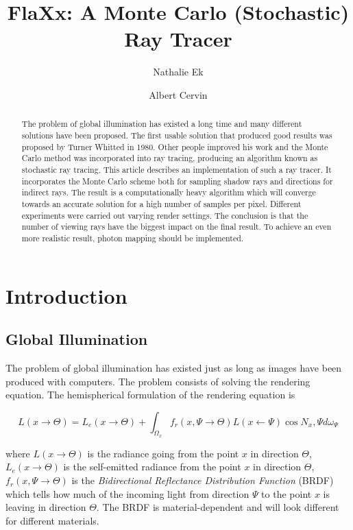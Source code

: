 \documentclass[a4paper]{report}
\begin{document}
\title{FlaXx: A Monte Carlo (Stochastic) Ray Tracer}
\author{Nathalie Ek \and Albert Cervin}

\maketitle

\begin{abstract}
The problem of global illumination has existed a long time and many
different solutions have been proposed. The first usable solution that
produced good results was proposed by Turner Whitted \cite{whitted} in
1980. Other people improved his work and the Monte Carlo method was
incorporated into ray tracing, producing an algorithm known as
stochastic ray tracing. This article describes an implementation of
such a ray tracer. It incorporates the Monte Carlo scheme both for
sampling shadow rays and directions for indirect rays. The result is a
computationally heavy algorithm which will converge towards an
accurate solution for a high number of samples
per pixel. Different experiments
were carried out varying render settings. The conclusion
is that the number of viewing rays have the biggest impact on the
final result. To achieve an even more realistic result, photon mapping
should be implemented.
\end{abstract}

\tableofcontents

\listoffigures

\chapter{Introduction}

\section{Global Illumination}

The problem of global illumination has existed just as long as images
have been produced with computers. The problem consists of solving the
rendering equation. The hemispherical formulation of the rendering equation is

\begin{equation}
  L(x \to \Theta) = L_e(x \to \Theta) + \int_{\Omega_x}f_r(x,\Psi \to \Theta)L(x \gets \Psi)\cos{N_x,\Psi}d\omega_\Psi
  \label{eq:renderingeq}
\end{equation}

where \(L(x \to \Theta)\) is the radiance going from the point \(x\)
in direction \(\Theta\), \(L_e(x \to \Theta) \) is the self-emitted
radiance from the point \(x\) in direction \(\Theta\), \(f_r(x,\Psi
\to \Theta)\) is the \emph{Bidirectional Reflectance Distribution Function}
(BRDF) which tells how much of the incoming light from direction
\(\Psi\) to the point \(x\) is leaving in direction \(\Theta\). The
BRDF is material-dependent and will look different for different materials.
\end{document}
